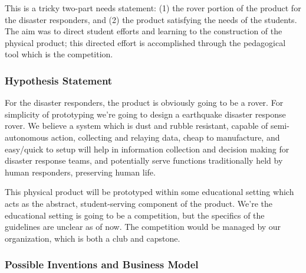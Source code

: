 \documentclass[a4paper, 10pt]{article}
\begin{document}
		This is a tricky two-part needs statement: (1) the rover portion of the product for the disaster responders, and (2) the product satisfying the needs of the students. The aim was to direct student efforts and learning to the construction of the physical product; this directed effort is accomplished through the pedagogical tool which is the competition. 

		\subsubsection{Hypothesis Statement}
		For the disaster responders, the product is obviously going to be a rover. For simplicity of prototyping we're going to design a earthquake disaster response rover. We believe a system which is dust and rubble resistant, capable of semi-autonomous action, collecting and relaying data, cheap to manufacture, and easy/quick to setup will help in information collection and decision making for disaster response teams, and potentially serve functions traditionally held by human responders, preserving human life. 
		
		This physical product will be prototyped within some educational setting which acts as the abstract, student-serving component of the product. We're the educational setting is going to be a competition, but the specifics of the guidelines are unclear as of now. The competition would be managed by our organization, which is both a club and capstone. 

		\subsubsection{Possible Inventions and Business Model}
\end{document}
